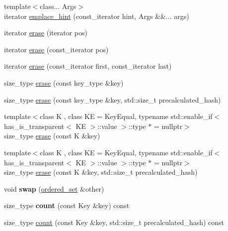 \begin{DoxyCompactItemize}
\item 
{\footnotesize template$<$class... Args$>$ }\\iterator \mbox{\hyperlink{classtsl_1_1ordered__set_ad266d5e2425b6af842790944fa75ef76}{emplace\+\_\+hint}} (const\+\_\+iterator hint, Args \&\&... args)
\item 
iterator \mbox{\hyperlink{classtsl_1_1ordered__set_a91cb7fc84c0bfab1c196109d416bad85}{erase}} (iterator pos)
\item 
iterator \mbox{\hyperlink{classtsl_1_1ordered__set_a05c3e96aba2834dcc28b22ee8699c914}{erase}} (const\+\_\+iterator pos)
\item 
iterator \mbox{\hyperlink{classtsl_1_1ordered__set_a318c0fb661e5e389f82bcb9f157db45d}{erase}} (const\+\_\+iterator first, const\+\_\+iterator last)
\item 
size\+\_\+type \mbox{\hyperlink{classtsl_1_1ordered__set_a4a1e1054dd9e86fc0617070ad35f8d45}{erase}} (const key\+\_\+type \&key)
\item 
size\+\_\+type \mbox{\hyperlink{classtsl_1_1ordered__set_a35895b2267b33386efdc0ccf2b262154}{erase}} (const key\+\_\+type \&key, std\+::size\+\_\+t precalculated\+\_\+hash)
\item 
{\footnotesize template$<$class K , class KE  = Key\+Equal, typename std\+::enable\+\_\+if$<$ has\+\_\+is\+\_\+transparent$<$ K\+E $>$\+::value $>$\+::type $\ast$  = nullptr$>$ }\\size\+\_\+type \mbox{\hyperlink{classtsl_1_1ordered__set_aabc0464c0f492f1b411fcef7ac396936}{erase}} (const K \&key)
\item 
{\footnotesize template$<$class K , class KE  = Key\+Equal, typename std\+::enable\+\_\+if$<$ has\+\_\+is\+\_\+transparent$<$ K\+E $>$\+::value $>$\+::type $\ast$  = nullptr$>$ }\\size\+\_\+type \mbox{\hyperlink{classtsl_1_1ordered__set_a7e0e6377f984cd852e8861174fc28786}{erase}} (const K \&key, std\+::size\+\_\+t precalculated\+\_\+hash)
\item 
\mbox{\label{classtsl_1_1ordered__set_ac2982b9af31dc0cfc8a9eccd9fe325fc}} 
void {\bfseries swap} (\mbox{\hyperlink{classtsl_1_1ordered__set}{ordered\+\_\+set}} \&other)
\item 
\mbox{\label{classtsl_1_1ordered__set_aa5ec8f539f3a0dc869bd024bde891c8a}} 
size\+\_\+type {\bfseries count} (const Key \&key) const
\item 
size\+\_\+type \mbox{\hyperlink{classtsl_1_1ordered__set_a6671d647ef9402361c009af2f47e29ba}{count}} (const Key \&key, std\+::size\+\_\+t precalculated\+\_\+hash) const

\end{DoxyCompactItemize}
